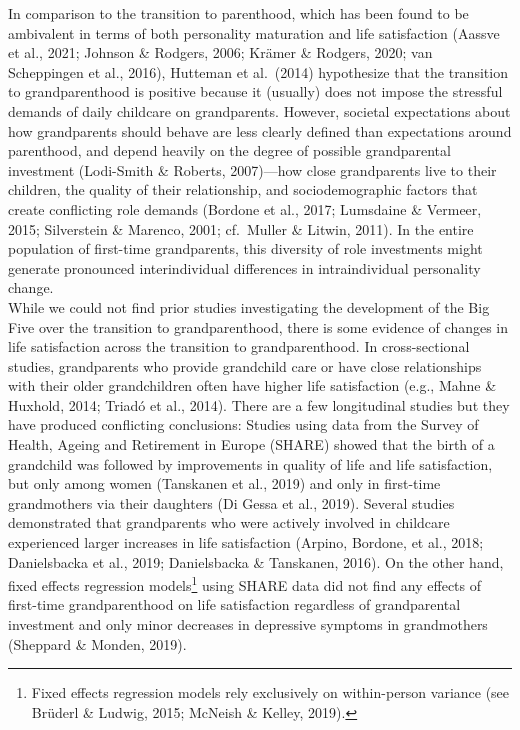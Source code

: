 \documentclass[
  english,
  man, noextraspace,floatsintext]{apa7}
\begin{document}
In comparison to the transition to parenthood, which has been found to be ambivalent in terms of both personality maturation and life satisfaction (Aassve et al., 2021; Johnson \& Rodgers, 2006; Krämer \& Rodgers, 2020; van Scheppingen et al., 2016), Hutteman et al.~(2014) hypothesize that the transition to grandparenthood is positive because it (usually) does not impose the stressful demands of daily childcare on grandparents. However, societal expectations about how grandparents should behave are less clearly defined than expectations around parenthood, and depend heavily on the degree of possible grandparental investment (Lodi-Smith \& Roberts, 2007)---how close grandparents live to their children, the quality of their relationship, and sociodemographic factors that create conflicting role demands (Bordone et al., 2017; Lumsdaine \& Vermeer, 2015; Silverstein \& Marenco, 2001; cf.~Muller \& Litwin, 2011). In the entire population of first-time grandparents, this diversity of role investments might generate pronounced interindividual differences in intraindividual personality change.\\
While we could not find prior studies investigating the development of the Big Five over the transition to grandparenthood, there is some evidence of changes in life satisfaction across the transition to grandparenthood. In cross-sectional studies, grandparents who provide grandchild care or have close relationships with their older grandchildren often have higher life satisfaction (e.g., Mahne \& Huxhold, 2014; Triadó et al., 2014). There are a few longitudinal studies but they have produced conflicting conclusions: Studies using data from the Survey of Health, Ageing and Retirement in Europe (SHARE) showed that the birth of a grandchild was followed by improvements in quality of life and life satisfaction, but only among women (Tanskanen et al., 2019) and only in first-time grandmothers via their daughters (Di Gessa et al., 2019). Several studies demonstrated that grandparents who were actively involved in childcare experienced larger increases in life satisfaction (Arpino, Bordone, et al., 2018; Danielsbacka et al., 2019; Danielsbacka \& Tanskanen, 2016). On the other hand, fixed effects regression models\footnote{Fixed effects regression models rely exclusively on within-person variance (see Brüderl \& Ludwig, 2015; McNeish \& Kelley, 2019).} using SHARE data did not find any effects of first-time grandparenthood on life satisfaction regardless of grandparental investment and only minor decreases in depressive symptoms in grandmothers (Sheppard \& Monden, 2019).\\
\end{document}
